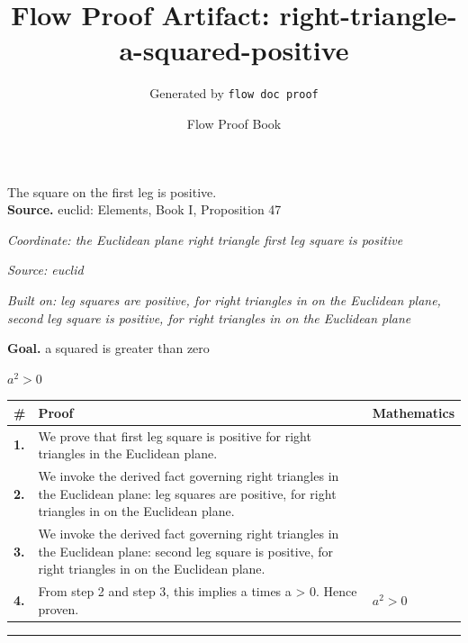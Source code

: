 \documentclass[11pt]{article}
\title{Flow Proof Artifact: right-triangle-a-squared-positive}
\author{Generated by \texttt{flow doc proof}}
\date{Flow Proof Book}
\theoremstyle{definition}
\begin{document}
\maketitle
The square on the first leg is positive.\\[0.5em]
\textbf{Source.} euclid: Elements, Book I, Proposition 47\\[0.5em]
\bigskip
{}\par
\smallskip\noindent\textit{Coordinate: the Euclidean plane \cdot right triangle \cdot first leg square is positive}\par
\smallskip\noindent\textit{Source: euclid}\par
\smallskip\noindent\textit{Built on: leg squares are positive, for right triangles in on the Euclidean plane, second leg square is positive, for right triangles in on the Euclidean plane}\par
\medskip
\noindent\textbf{Goal.} a squared is greater than zero\par
\noindent$\displaystyle a^{2} > 0$\par
\medskip
\noindent
\begin{tabular}{@{} >{\raggedright\arraybackslash}p{} >{\raggedright\arraybackslash}p{} >{\raggedleft\arraybackslash}p{} @{}}
\textbf{\#} & \textbf{Proof} & \textbf{Mathematics} \\
\midrule
\textbf{1.} & We prove that first leg square is positive for right triangles in the Euclidean plane. & \\[0.45em]
\textbf{2.} & We invoke the derived fact governing right triangles in the Euclidean plane: leg squares are positive, for right triangles in on the Euclidean plane. & \\[0.45em]
\textbf{3.} & We invoke the derived fact governing right triangles in the Euclidean plane: second leg square is positive, for right triangles in on the Euclidean plane. & \\[0.45em]
\textbf{4.} & From step 2 and step 3, this implies a times a > 0. Hence proven. & $\displaystyle a^{2} > 0$ \\[0.45em]
\bottomrule
\end{tabular}
\label{thm:Geometry-right triangle-first_leg_square_is_positive}
\par\medskip\hrule
\end{document}
